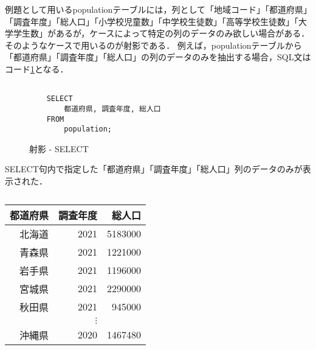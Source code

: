 例題として用いるpopulationテーブルには，列として「地域コード」「都道府県」「調査年度」「総人口」「小学校児童数」「中学校生徒数」「高等学校生徒数」「大学学生数」があるが，ケースによって特定の列のデータのみ欲しい場合がある． そのようなケースで用いるのが射影である． 例えば，populationテーブルから「都道府県」「調査年度」「総人口」の列のデータのみを抽出する場合，SQL文はコード\ref{code:sql-select}となる．
\begin{figure}[tb]
    \begin{verbatim}

    SELECT
        都道府県, 調査年度, 総人口
    FROM
        population;
    \end{verbatim}
    \captionsetup{name=コード}
    \caption{射影 - SELECT}
    \label{code:sql-select}
\end{figure}
SELECT句内で指定した「都道府県」「調査年度」「総人口」列のデータのみが表示された．

\begin{table}[tb]
    \centering
    \begin{tabular}{rrr}
    \toprule
    \textbf{都道府県} & \textbf{調査年度} & \textbf{総人口} \\ \midrule
    北海道           & 2021          & 5183000      \\
    青森県           & 2021          & 1221000      \\
    岩手県           & 2021          & 1196000      \\
    宮城県           & 2021          & 2290000      \\
    秋田県           & 2021          & 945000       \\
                  & $\vdots$      &              \\
    沖縄県           & 2020          & 1467480      \\ \bottomrule
    \end{tabular}
    \caption{}
    \label{tb:}
\end{table}

